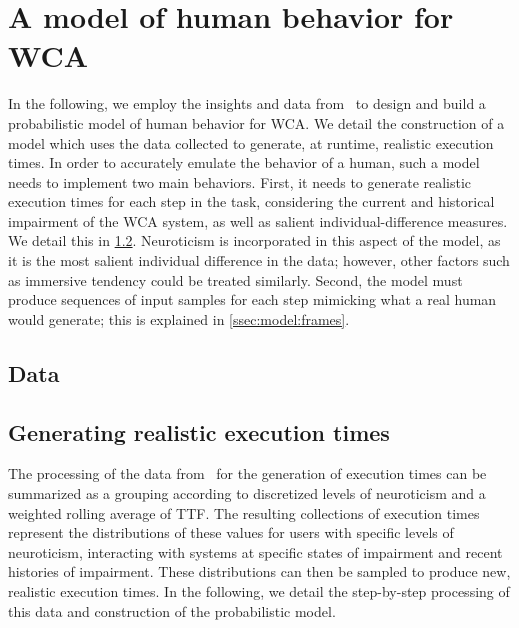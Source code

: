 \section{A model of human behavior for \ac{WCA}}\label{sec:model}

In the following, we employ the insights and data from~\cite{olguinmunoz2021impact} to design and build a probabilistic model of human behavior for \ac{WCA}.
We detail the construction of a model which uses the data collected to generate, at runtime, realistic execution times. 
In order to accurately emulate the behavior of a human, such a model needs to implement two main behaviors.
First, it needs to generate realistic execution times for each step in the task, considering the current and historical impairment of the \ac{WCA} system, as well as salient individual-difference measures.
We detail this in \cref{ssec:model:exectimes}.
Neuroticism is incorporated in this aspect of the model, as it is the most salient individual difference in the data; however, other factors such as immersive tendency could be treated similarly.
Second, the model must produce sequences of input samples for each step mimicking what a real human would generate; this is explained in \cref{ssec:model:frames}. 

\subsection{Data}


\subsection{Generating realistic execution times}\label{ssec:model:exectimes}

The processing of the data from~\cite{olguinmunoz2021impact} for the generation of execution times can be summarized as a grouping according to discretized levels of neuroticism and a weighted rolling average of \ac{TTF}.
The resulting collections of execution times represent the distributions of these values for users with specific levels of neuroticism, interacting with systems at specific states of impairment and recent histories of impairment.
These distributions can then be sampled to produce new, realistic execution times.
In the following, we detail the step-by-step processing of this data and construction of the probabilistic model.

